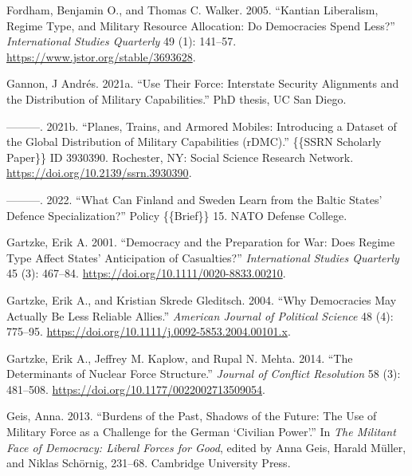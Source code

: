\documentclass[
  12,
  letterpaper,
  DIV=11,
  numbers=noendperiod]{scrartcl}
\newlength{\cslhangindent}
\newlength{\cslentryspacingunit} %
\newenvironment{CSLReferences}[2] %
 {%
  \setlength{\parindent}{0pt}
  \ifodd #1
  \let\oldpar\par
  \def\par{\hangindent=\cslhangindent\oldpar}
  \fi
  \setlength{\parskip}{#2\cslentryspacingunit}
 }%
 {}
\begin{document}
\begin{CSLReferences}{1}{0}
\leavevmode{}%
Fordham, Benjamin O., and Thomas C. Walker. 2005. {``Kantian
{Liberalism}, {Regime Type}, and {Military Resource Allocation}: {Do
Democracies Spend Less}?''} \emph{International Studies Quarterly} 49
(1): 141--57. \url{https://www.jstor.org/stable/3693628}.

\leavevmode{}%
Gannon, J Andrés. 2021a. {``Use {Their Force}: {Interstate Security
Alignments} and the {Distribution} of {Military Capabilities}.''} PhD
thesis, UC San Diego.

\leavevmode{}%
---------. 2021b. {``Planes, {Trains}, and {Armored Mobiles}:
{Introducing} a {Dataset} of the {Global Distribution} of {Military
Capabilities} ({rDMC}).''} \{\{SSRN Scholarly Paper\}\} ID 3930390.
{Rochester, NY}: {Social Science Research Network}.
\url{https://doi.org/10.2139/ssrn.3930390}.

\leavevmode{}%
---------. 2022. {``What Can {Finland} and {Sweden} Learn from the
{Baltic} States' Defence Specialization?''} Policy \{\{Brief\}\} 15.
{NATO Defense College}.

\leavevmode{}%
Gartzke, Erik A. 2001. {``Democracy and the {Preparation} for {War}:
{Does Regime Type Affect States}' {Anticipation} of {Casualties}?''}
\emph{International Studies Quarterly} 45 (3): 467--84.
\url{https://doi.org/10.1111/0020-8833.00210}.

\leavevmode{}%
Gartzke, Erik A., and Kristian Skrede Gleditsch. 2004. {``Why
{Democracies May Actually Be Less Reliable Allies}.''} \emph{American
Journal of Political Science} 48 (4): 775--95.
\url{https://doi.org/10.1111/j.0092-5853.2004.00101.x}.

\leavevmode{}%
Gartzke, Erik A., Jeffrey M. Kaplow, and Rupal N. Mehta. 2014. {``The
{Determinants} of {Nuclear Force Structure}.''} \emph{Journal of
Conflict Resolution} 58 (3): 481--508.
\url{https://doi.org/10.1177/0022002713509054}.

\leavevmode{}%
Geis, Anna. 2013. {``Burdens of the Past, Shadows of the Future: The Use
of Military Force as a Challenge for the {German} {`Civilian Power'}.''}
In \emph{The {Militant Face} of {Democracy}: {Liberal Forces} for
{Good}}, edited by Anna Geis, Harald Müller, and Niklas Schörnig,
231--68. {Cambridge University Press}.


\end{CSLReferences}
\end{document}
